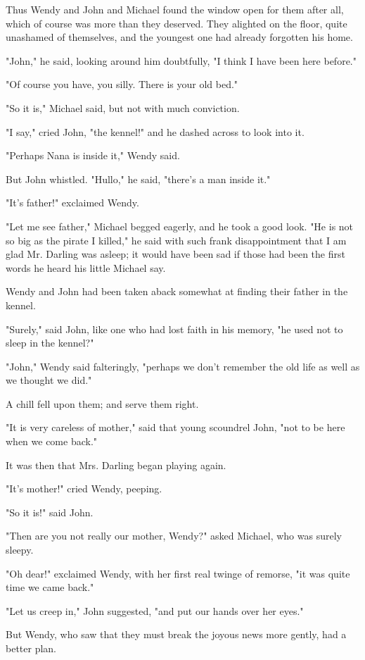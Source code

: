 Thus Wendy and John and Michael found the window open for them after all,
which of course was more than they deserved. They alighted on the floor,
quite unashamed of themselves, and the youngest one had already forgotten
his home.


"John," he said, looking around him doubtfully, "I think I have been here
before."


"Of course you have, you silly. There is your old bed."


"So it is," Michael said, but not with much conviction.


"I say," cried John, "the kennel!" and he dashed across to look into it.


"Perhaps Nana is inside it," Wendy said.


But John whistled. "Hullo," he said, "there's a man inside it."


"It's father!" exclaimed Wendy.


"Let me see father," Michael begged eagerly, and he took a good look. "He
is not so big as the pirate I killed," he said with such frank
disappointment that I am glad Mr. Darling was asleep; it would have been
sad if those had been the first words he heard his little Michael say.


Wendy and John had been taken aback somewhat at finding their father in
the kennel.


"Surely," said John, like one who had lost faith in his memory, "he used
not to sleep in the kennel?"


"John," Wendy said falteringly, "perhaps we don't remember the old life as
well as we thought we did."


A chill fell upon them; and serve them right.


"It is very careless of mother," said that young scoundrel John, "not to
be here when we come back."


It was then that Mrs. Darling began playing again.


"It's mother!" cried Wendy, peeping.


"So it is!" said John.


"Then are you not really our mother, Wendy?" asked Michael, who was surely
sleepy.


"Oh dear!" exclaimed Wendy, with her first real twinge of remorse,
"it was quite time we came back."


"Let us creep in," John suggested, "and put our hands over her eyes."


But Wendy, who saw that they must break the joyous news more gently, had a
better plan.


